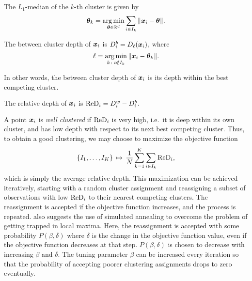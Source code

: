 \begin{definition}[$L_1$-median]
    The $L_1$-median of the $k$-th cluster is given by
    \begin{equation}
        \bm{\theta}_k = \operatorname*{arg\,min}_{\bm{\theta} \in \mathbb{R}^d} \sum_{i \in I_k} \Vert \bm{x}_i - \bm{\theta} \Vert.
    \end{equation}
\end{definition}

\begin{definition}
    The between cluster depth of $\bm{x}_i$ is $D_i^b = D_\ell(\bm{x}_i)$, where
    \begin{equation}
        \ell = \operatorname*{arg\,min}_{k \colon i \notin I_k} \Vert \bm{x}_i - \bm{\theta}_k \Vert.
    \end{equation}
\end{definition}

In other words, the between cluster depth of $\bm{x}_i$ is its depth within the
best competing cluster.

\begin{definition}
    The relative depth of $\bm{x}_i$ is $\operatorname{ReD}_i = D_i^w - D_i^b$.
\end{definition}

A point $\bm{x}_i$ is \emph{well clustered} if $\operatorname{ReD}_i$ is very high, i.e.\ it is
deep within its own cluster, and has low depth with respect to its next best
competing cluster.
Thus, to obtain a good clustering, we may choose to maximize the objective
function
\begin{equation}
    \{I_1, \dots, I_K\} \,\mapsto\, \frac{1}{N} \sum_{k = 1}^K \sum_{i \in I_k} \operatorname{ReD}_i,
\end{equation}
which is simply the average relative depth.
This maximization can be achieved iteratively, starting with a random cluster
assignment and reassigning a subset of observations with low $\operatorname{ReD}_i$ to their
nearest competing clusters.
The reassignment is accepted if the objective function increases, and the
process is repeated.
\textcite{jornsten-2004} also suggests the use of simulated annealing to
overcome the problem of getting trapped in local maxima.
Here, the reassignment is accepted with some probability $P(\beta, \delta)$
where $\delta$ is the change in the objective function value, even if the
objective function decreases at that step.
$P(\beta, \delta)$ is chosen to decrease with increasing $\beta$ and $\delta$.
The tuning parameter $\beta$ can be increased every iteration so that the
probability of accepting poorer clustering assignments drops to zero
eventually.


